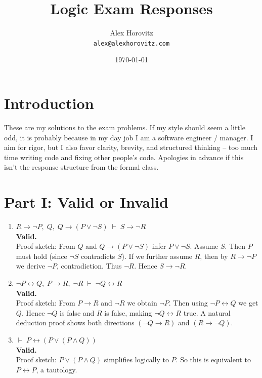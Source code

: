 \documentclass[12pt]{article}
\title{Logic Exam Responses}
\author{Alex Horovitz \\ \texttt{alex@alexhorovitz.com}}
\date{\today}
\begin{document}
\maketitle

\section*{Introduction}
These are my solutions to the exam problems. If my style should seem a little odd, it is probably because in my day job I am a software engineer / manager. I aim for rigor, but I also favor clarity, brevity, and structured thinking -- too much time writing code and fixing other people's code. Apologies in advance if this isn't the response structure from the formal class.

\section*{Part I: Valid or Invalid}

\begin{enumerate}[label=\arabic*.]

\item $R \to \neg P,\; Q,\; Q \to (P \lor \neg S) \;\vdash\; S \to \neg R$\\
\textbf{Valid.}\\
Proof sketch: From $Q$ and $Q \to (P \lor \neg S)$ infer $P \lor \neg S$. Assume $S$. Then $P$ must hold (since $\neg S$ contradicts $S$). If we further assume $R$, then by $R \to \neg P$ we derive $\neg P$, contradiction. Thus $\neg R$. Hence $S \to \neg R$.

\item $\neg P \leftrightarrow Q,\; P \to R,\; \neg R \;\vdash\; \neg Q \leftrightarrow R$\\
\textbf{Valid.}\\
Proof sketch: From $P \to R$ and $\neg R$ we obtain $\neg P$. Then using $\neg P \leftrightarrow Q$ we get $Q$. Hence $\neg Q$ is false and $R$ is false, making $\neg Q \leftrightarrow R$ true. A natural deduction proof shows both directions $(\neg Q \to R)$ and $(R \to \neg Q)$.

\item $\vdash\; P \leftrightarrow (P \lor (P \land Q))$\\
\textbf{Valid.}\\
Proof sketch: $P \lor (P \land Q)$ simplifies logically to $P$. So this is equivalent to $P \leftrightarrow P$, a tautology.

\end{enumerate}
\end{document}
